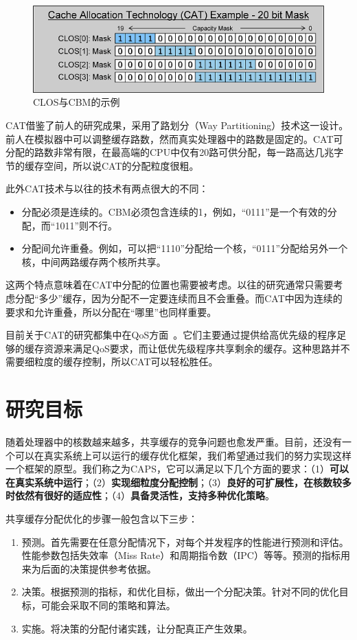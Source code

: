 \begin{figure}[htbp] 
    \centering
    \includegraphics[width=0.7\linewidth]{figures/CLOS.png}
    \caption{CLOS与CBM的示例}
    \label{fig:CLOS}
\end{figure}

CAT借鉴了前人的研究成果，采用了路划分（Way Partitioning）技术这一设计。前人在模拟器中可以调整缓存路数，然而真实处理器中的路数是固定的。CAT可分配的路数非常有限，在最高端的CPU中仅有20路可供分配，每一路高达几兆字节的缓存空间，所以说CAT的分配粒度很粗。

此外CAT技术与以往的技术有两点很大的不同：
\begin{itemize}
\item 分配必须是连续的。CBM必须包含连续的1，例如，“0111”是一个有效的分配，而“1011”则不行。
\item 分配间允许重叠。例如，可以把“1110”分配给一个核，“0111”分配给另外一个核，中间两路缓存两个核所共享。
\end{itemize}

这两个特点意味着在CAT中分配的位置也需要被考虑。以往的研究通常只需要考虑分配“多少”缓存，因为分配不一定要连续而且不会重叠。而CAT中因为连续的要求和允许重叠，所以分配在“哪里”也同样重要。

目前关于CAT的研究都集中在QoS方面~\parencite{lo2015heracles, herdrich2016cache, funaro2016ginseng}。它们主要通过提供给高优先级的程序足够的缓存资源来满足QoS要求，而让低优先级程序共享剩余的缓存。这种思路并不需要细粒度的缓存控制，所以CAT可以轻松胜任。

\section{研究目标}
随着处理器中的核数越来越多，共享缓存的竞争问题也愈发严重。目前，还没有一个可以在真实系统上可以运行的缓存优化框架，我们希望通过我们的努力实现这样一个框架的原型。我们称之为CAPS，它可以满足以下几个方面的要求：（1）\textbf{可以在真实系统中运行}；（2）\textbf{实现细粒度分配控制}；（3）\textbf{良好的可扩展性，在核数较多时依然有很好的适应性}；（4）\textbf{具备灵活性，支持多种优化策略}。

共享缓存分配优化的步骤一般包含以下三步：
\begin{enumerate}
\item 预测。首先需要在任意分配情况下，对每个并发程序的性能进行预测和评估。性能参数包括失效率（Miss Rate）和周期指令数（IPC）等等。预测的指标用来为后面的决策提供参考依据。
\item 决策。根据预测的指标，和优化目标，做出一个分配决策。针对不同的优化目标，可能会采取不同的策略和算法。
\item 实施。将决策的分配付诸实践，让分配真正产生效果。
\end{enumerate}

